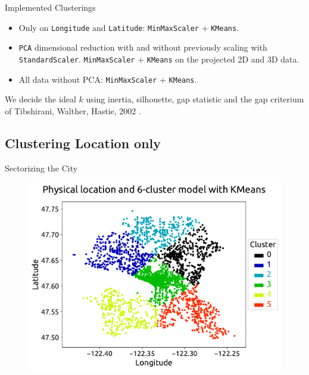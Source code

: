 \documentclass[t,11pt,compress,xcolor=table,hyperref={bookmarks=false}]{beamer}
\begin{document}
\begin{frame}[fragile]{Implemented Clusterings}

\begin{itemize}
\item Only on \verb|Longitude| and \verb|Latitude|: \verb|MinMaxScaler| + \verb|KMeans|.

\item \verb|PCA| dimensional reduction with and without previously scaling with \verb|StandardScaler|. \verb|MinMaxScaler| + \verb|KMeans| on the projected 2D and 3D data.

\item All data without PCA: \verb|MinMaxScaler| + \verb|KMeans|.
\end{itemize}

We decide the ideal $k$ using inertia, silhouette, gap statistic and the gap criterium of Tibshirani, Walther, Hastie, 2002 \cite{Tibshirani}.

\end{frame}

\subsection{Clustering Location only}

\begin{frame}{Sectorizing the City}
\begin{figure}[ht!]
\includegraphics[scale=0.45]{figs/STORY_loc_location.pdf}
\end{figure}
\end{frame}
\end{document}
